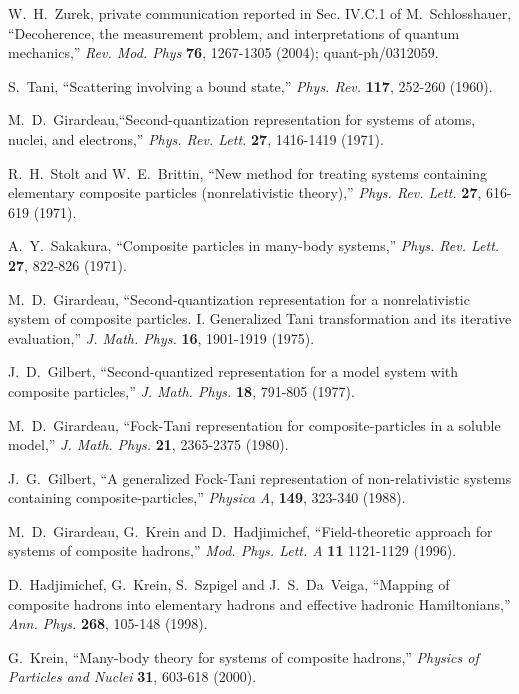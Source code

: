 \documentclass[12pt]{article}
\begin{document}
{\begin{thebibliography}{99}
W.~H.~Zurek, private communication reported in  Sec. IV.C.1 of 
M.~Schlosshauer, ``Decoherence, the measurement problem, and interpretations of quantum mechanics,'' {\em Rev. Mod. Phys}\/ {\bf 76}, 1267-1305 (2004); quant-ph/0312059.




S.~Tani, ``Scattering involving a bound state,'' {\em Phys. Rev.}\/ {\bf 117}, 252-260 (1960).

M.~D.~Girardeau,``Second-quantization representation for systems of atoms, nuclei, and electrons,'' {\em Phys. Rev. Lett.}\/ {\bf 27}, 1416-1419 
(1971).
	
R.~H.~Stolt and W.~E.~Brittin, ``New method for treating systems containing elementary composite particles (nonrelativistic theory),'' {\em Phys. Rev. Lett.}\/ {\bf 27}, 616-619
(1971).

A.~Y.~Sakakura, ``Composite particles in many-body systems,'' {\em Phys. Rev. Lett.}\/ {\bf 27}, 822-826 (1971).

M.~D.~Girardeau, ``Second-quantization representation for a nonrelativistic system of composite particles. I. Generalized Tani transformation and its iterative evaluation,''
{\em J. Math. Phys.}\/ {\bf 16}, 1901-1919 (1975).

 J.~D.~Gilbert, ``Second-quantized representation for a model system with composite particles,''
{\em J. Math. Phys.}\/ {\bf 18}, 791-805 (1977).

M.~D.~Girardeau, ``Fock-Tani representation for composite-particles in a soluble model,''
{\em J. Math. Phys.}\/ {\bf 21}, 2365-2375 (1980). 

 J.~G.~Gilbert, ``A generalized Fock-Tani representation of non-relativistic systems containing composite-particles,''
{\em Physica A}\/, {\bf 149}, 323-340 (1988). 

 M.~D.~Girardeau, G.~Krein and  D.~Hadjimichef, ``Field-theoretic approach for systems of composite hadrons,''
{\em Mod. Phys. Lett. A} {\bf 11}  1121-1129   (1996). 

D.~Hadjimichef, G.~Krein, S.~Szpigel and J.~S.~Da~Veiga, ``Mapping of composite hadrons into elementary hadrons and effective hadronic Hamiltonians,''
{\em Ann. Phys.}\/ {\bf 268}, 105-148 (1998). 

 G.~Krein, ``Many-body theory for systems of composite hadrons,''
{\em Physics of Particles and Nuclei}\/ {\bf 31}, 603-618  (2000). 


\end{thebibliography}}
\end{document}
